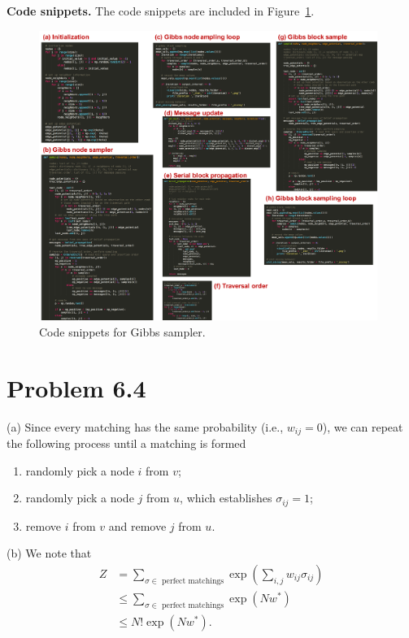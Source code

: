 \documentclass{article}
\begin{document}
\noindent
\textbf{Code snippets.}
The code snippets are included in Figure~\ref{f:code}.
%
\begin{figure}[h]
\centering
\vspace{-0.2cm}
\includegraphics[width=0.98\textwidth]{./computational/code_screenshots/code.pdf}
\vspace{-0.2cm}
\caption{Code snippets for Gibbs sampler.}
\label{f:code}
\end{figure}

\pagebreak
\section*{Problem 6.4}
(a) Since every matching has the same probability (i.e., $w_{ij} = 0$), we can repeat
the following process until a matching is formed
\begin{enumerate}
	\item randomly pick a node $i$ from $v$;
	\item randomly pick a node $j$ from $u$, which establishes $\sigma_{ij}=1$;
	\item remove $i$ from $v$ and remove $j$ from $u$.\\
\end{enumerate}

\noindent
(b) We note that
\begin{align}
	Z &= \sum_{\sigma\in\text{ perfect matchings}} \exp\left(\sum_{i,j}w_{ij}\sigma_{ij}\right)\\
	&\leq \sum_{\sigma\in\text{ perfect matchings}} \exp\left(Nw^*\right) \label{eq:64b_1}\\
	&\leq N!\exp\left(Nw^*\right) \label{eq:64b_2}.
\end{align}
\end{document}
